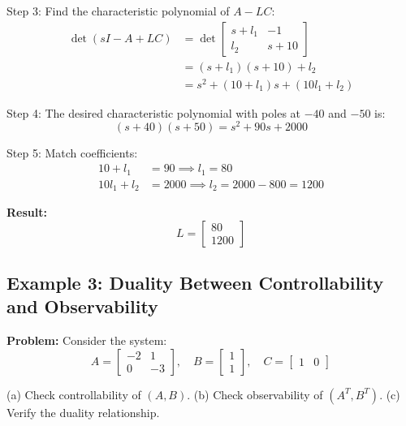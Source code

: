 \begin{examplebox}
Step 3: Find the characteristic polynomial of $A - LC$:
\begin{align}
\det(sI - A + LC) &= \det\begin{bmatrix} s + l_1 & -1 \\ l_2 & s + 10 \end{bmatrix} \\
&= (s + l_1)(s + 10) + l_2 \\
&= s^2 + (10 + l_1)s + (10l_1 + l_2)
\end{align}

Step 4: The desired characteristic polynomial with poles at $-40$ and $-50$ is:
\begin{equation}
(s + 40)(s + 50) = s^2 + 90s + 2000
\end{equation}

Step 5: Match coefficients:
\begin{align}
10 + l_1 &= 90 \implies l_1 = 80 \\
10l_1 + l_2 &= 2000 \implies l_2 = 2000 - 800 = 1200
\end{align}

\textbf{Result:}
\begin{equation}
\boxed{L = \begin{bmatrix} 80 \\ 1200 \end{bmatrix}}
\end{equation}
\end{examplebox}

\hrulefill

\subsection{Example 3: Duality Between Controllability and Observability}

\textbf{Problem:} Consider the system:
\begin{equation}
A = \begin{bmatrix} -2 & 1 \\ 0 & -3 \end{bmatrix}, \quad
B = \begin{bmatrix} 1 \\ 1 \end{bmatrix}, \quad
C = \begin{bmatrix} 1 & 0 \end{bmatrix}
\end{equation}

(a) Check controllability of $(A, B)$. (b) Check observability of $(A^T, B^T)$. (c) Verify the duality relationship.

